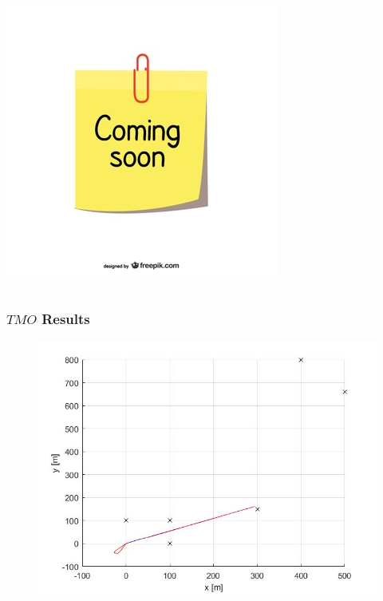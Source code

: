 \documentclass{beamer}
\begin{document}
\begin{frame}
\begin{columns}[t]
			\includegraphics[scale=0.18]{coming-soon}
		\end{columns}
	\end{frame}

	\begin{frame}
		\frametitle{$TMO$ Results}
		\begin{figure}
			\includegraphics[scale=0.4]{traj}
		\end{figure}
	\end{frame}
	
		
	
	
	
\end{document}
